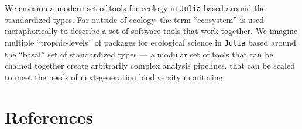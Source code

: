 \documentclass[10pt,oneside]{article}
\begin{document}
We envision a modern set of tools for ecology in \texttt{Julia} based
around the standardized types. Far outside of ecology, the term
``ecosystem'' is used metaphorically to describe a set of software tools
that work together. We imagine multiple ``trophic-levels'' of packages
for ecological science in \texttt{Julia} based around the ``basal'' set
of standardized types --- a modular set of tools that can be chained
together create arbitrarily complex analysis pipelines. that can be
scaled to meet the needs of next-generation biodiversity monitoring.

\hypertarget{references}{%
\section*{References}\label{references}}
\end{document}
